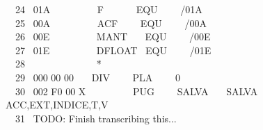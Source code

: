 \documentclass[a4paper,12pt]{article}
\begin{document}
\phantom \ \ 24 \ 01A \ \ \ \ \ \ \ \ \ F \ \ \ \ \ \ EQU \ \ \ \ /01A\\
\phantom \ \ 25 \ 00A \ \ \ \ \ \ \ \ \ ACF \ \ \ \ EQU \ \ \ \ /00A\\
\phantom \ \ 26 \ 00E \ \ \ \ \ \ \ \ \ MANT \ \ \ EQU \ \ \ \ /00E\\
\phantom \ \ 27 \ 01E \ \ \ \ \ \ \ \ \ DFLOAT \ EQU \ \ \ \ /01E\\
\phantom \ \ 28 \ \ \ \ \ \ \ \ \ \ \ \ \ \ *\\
\phantom \ \ 29 \ 000 00 00 \ \ \ DIV \ \ \ \ PLA \ \ \ \ 0\\
\phantom \ \ 30 \ 002 F0 00 X \ \ \ \ \ \ \ \ \ PUG \ \ \ \ SALVA \ \ \ SALVA ACC,EXT,INDICE,T,V\\
\phantom \ \ 31 \ TODO: Finish transcribing this...\\
\end{document}
